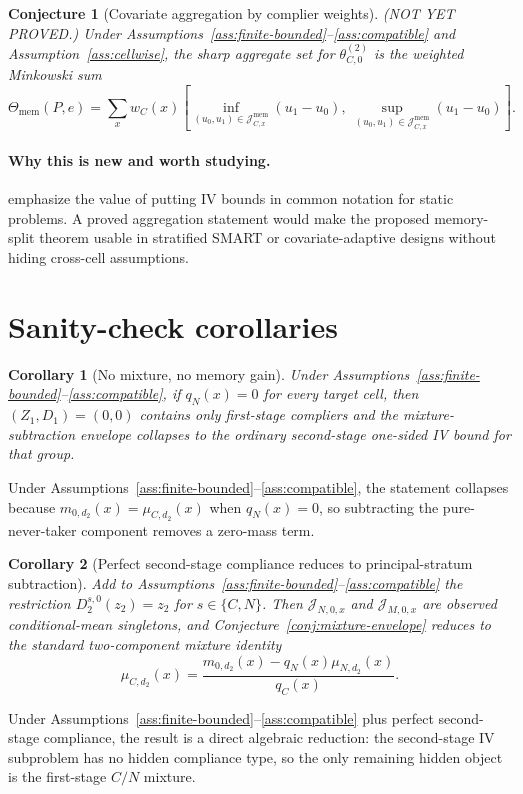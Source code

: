 \documentclass[11pt]{article}
\theoremstyle{definition}
\theoremstyle{plain}
\newtheorem{conjecture}{Conjecture}
\newtheorem{corollary}{Corollary}
\theoremstyle{remark}
\begin{document}
\begin{conjecture}[Covariate aggregation by complier weights]\label{conj:aggregation}
(NOT YET PROVED.)  Under Assumptions~\ref{ass:finite-bounded}--\ref{ass:compatible} and Assumption~\ref{ass:cellwise}, the sharp aggregate set for \(\theta_{C,0}^{(2)}\) is the weighted Minkowski sum
\[
\Theta_{\mathrm{mem}}(P,e)
=
\sum_x w_C(x)
\left[
\inf_{(u_0,u_1)\in\mathcal{J}_{C,x}^{\mathrm{mem}}}(u_1-u_0),\
\sup_{(u_0,u_1)\in\mathcal{J}_{C,x}^{\mathrm{mem}}}(u_1-u_0)
\right].
\]
\end{conjecture}
\paragraph{Why this is new and worth studying.}
\citet{SwansonHernanMillerRobinsRichardson2018} emphasize the value of putting IV bounds in common notation for static problems.  A proved aggregation statement would make the proposed memory-split theorem usable in stratified SMART or covariate-adaptive designs without hiding cross-cell assumptions.

\section{Sanity-check corollaries}
\begin{corollary}[No mixture, no memory gain]\label{cor:no-mixture}
Under Assumptions~\ref{ass:finite-bounded}--\ref{ass:compatible}, if \(q_N(x)=0\) for every target cell, then \((Z_1,D_1)=(0,0)\) contains only first-stage compliers and the mixture-subtraction envelope collapses to the ordinary second-stage one-sided IV bound for that group.
\end{corollary}
Under Assumptions~\ref{ass:finite-bounded}--\ref{ass:compatible}, the statement collapses because \(m_{0,d_2}(x)=\mu_{C,d_2}(x)\) when \(q_N(x)=0\), so subtracting the pure-never-taker component removes a zero-mass term.

\begin{corollary}[Perfect second-stage compliance reduces to principal-stratum subtraction]\label{cor:perfect-stage2}
Add to Assumptions~\ref{ass:finite-bounded}--\ref{ass:compatible} the restriction \(D_2^{s,0}(z_2)=z_2\) for \(s\in\{C,N\}\).  Then \(\mathcal{J}_{N,0,x}\) and \(\mathcal{J}_{M,0,x}\) are observed conditional-mean singletons, and Conjecture~\ref{conj:mixture-envelope} reduces to the standard two-component mixture identity
\[
\mu_{C,d_2}(x)=\frac{m_{0,d_2}(x)-q_N(x)\mu_{N,d_2}(x)}{q_C(x)}.
\]
\end{corollary}
Under Assumptions~\ref{ass:finite-bounded}--\ref{ass:compatible} plus perfect second-stage compliance, the result is a direct algebraic reduction: the second-stage IV subproblem has no hidden compliance type, so the only remaining hidden object is the first-stage \(C/N\) mixture.
\end{document}
